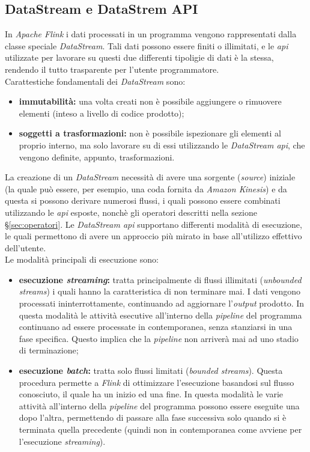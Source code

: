\subsection{DataStream e DataStrem API}
In \textit{Apache Flink} i dati processati in un programma vengono rappresentati dalla classe speciale \textit{DataStream}.
Tali dati possono essere finiti o illimitati, e le \textit{\gls{api}} utilizzate per lavorare su questi due differenti tipoligie di dati è la stessa, rendendo il tutto trasparente per l'utente programmatore.\\
Carattestiche fondamentali dei \textit{DataStream} sono:
\begin{itemize}
	\item{\textbf{immutabilità:} una volta creati non è possibile aggiungere o rimuovere elementi (inteso a livello di codice prodotto);}
	\item{\textbf{soggetti a trasformazioni:} non è possibile ispezionare gli elementi al proprio interno, ma solo lavorare su di essi utilizzando le \textit{DataStream \textit{\gls{api}}}, che vengono definite, appunto, trasformazioni.}
\end{itemize}
La creazione di un \textit{DataStream} necessità di avere una sorgente (\textit{source}) iniziale (la quale può essere, per esempio, una coda fornita da \textit{\gls{Amazon Kinesis}}) e da questa si possono derivare numerosi flussi, i quali possono essere combinati utilizzando le \textit{\gls{api}} esposte, nonchè gli operatori descritti nella sezione \S\ref{sec:operatori}.
Le \textit{DataStream \textit{\gls{api}}} supportano differenti modalità di esecuzione, le quali permettono di avere un approccio più mirato in base all'utilizzo effettivo dell'utente.\\
Le modalità principali di esecuzione sono:
\begin{itemize}
	\item{\textbf{esecuzione \textit{streaming}:} tratta principalmente di flussi illimitati (\textit{\gls{unbounded streams}}) i quali hanno la caratteristica di non terminare mai. I dati vengono processati ininterrottamente, continuando ad aggiornare l'\textit{output} prodotto. In questa modalità le attività esecutive all'interno della \textit{\gls{pipeline}} del programma continuano ad essere processate in contemporanea, senza stanziarsi in una fase specifica. Questo implica che la \textit{\gls{pipeline}} non arriverà mai ad uno stadio di terminazione;}
	\item{\textbf{esecuzione \textit{batch}:} tratta solo flussi limitati (\textit{\gls{bounded streams}}). Questa procedura permette a \textit{Flink} di ottimizzare l'esecuzione basandosi sul flusso conosciuto, il quale ha un inizio ed una fine. In questa modalità le varie attività all'interno della \textit{\gls{pipeline}} del programma possono essere eseguite una dopo l'altra, permettendo di passare alla fase successiva solo quando si è terminata quella precedente (quindi non in contemporanea come avviene per l'esecuzione \textit{streaming})}.
\end{itemize}

